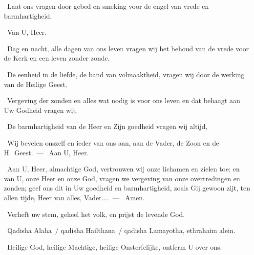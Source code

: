 \documentclass[12pt,twoside,a5paper]{article}
\begin{document}


\begin{halfparskip}
  \liturgicalLbracket\dd~Laat ons vragen door gebed en smeking voor de engel van vrede en barmhartigheid.

  \rr~Van U, Heer. 

  \dd~Dag en nacht, alle dagen van ons leven vragen wij het behoud van de vrede voor de Kerk en een leven zonder zonde.

  \dd~De eenheid in de liefde, de band van volmaaktheid, vragen wij door de werking van de Heilige Geest,

  \dd~Vergeving der zonden en alles wat nodig is voor ons leven en dat behaagt aan Uw Godheid vragen wij,

  \dd~De barmhartigheid van de Heer en Zijn goedheid vragen wij altijd,\liturgicalRbracket

  \dd~Wij bevelen onszelf en ieder van ons aan, aan de Vader, de Zoon en de H.~Geest.~--- \rr~Aan U, Heer.

  \cc~Aan U, Heer, almachtige God, vertrouwen wij onze lichamen en zielen toe; en van U, onze Heer en onze God, vragen we vergeving van onze overtredingen en zonden; geef ons dit in Uw goedheid en barmhartigheid, zoals Gij gewoon zijt, ten allen tijde, Heer van alles, Vader....~--- \rr~Amen.
\end{halfparskip}



\dd~Verheft uw stem, geheel het volk, en prijst de levende God.

\vspace{\parskip}
\begin{doublecols}
  \fontsize{11}{12}\selectfont

  \dutchl \rr~Qadisha Alaha~/ qadisha Hailthana~/ qadisha Lamayotha, ethrahaim alein.

   \rr~Heilige God, heilige Machtige, heilige Onsterfelijke, ontferm U over ons.
\end{doublecols}
\end{document}

